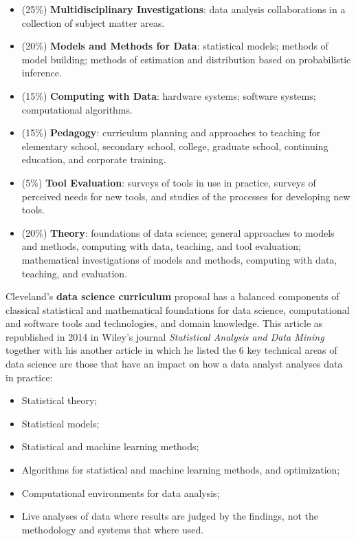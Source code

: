 \documentclass[
]{book}
\providecommand{\tightlist}{%
  \setlength{\itemsep}{0pt}\setlength{\parskip}{0pt}}
\begin{document}
\begin{itemize}
\item
  (25\%) \textbf{Multidisciplinary Investigations}: data analysis collaborations in a collection of subject matter areas.
\item
  (20\%) \textbf{Models and Methods for Data}: statistical models; methods of model building; methods of estimation and distribution based on probabilistic inference.
\item
  (15\%) \textbf{Computing with Data}: hardware systems; software systems; computational algorithms.
\item
  (15\%) \textbf{Pedagogy}: curriculum planning and approaches to teaching for elementary school, secondary school, college, graduate school, continuing education, and corporate training.
\item
  (5\%) \textbf{Tool Evaluation}: surveys of tools in use in practice, surveys of perceived needs for new tools, and studies of the processes for developing new tools.
\item
  (20\%) \textbf{Theory}: foundations of data science; general approaches to models and methods, computing with data, teaching, and tool evaluation; mathematical investigations of models and methods, computing with data, teaching, and evaluation.
\end{itemize}

Cleveland's \textbf{data science curriculum} proposal has a balanced components of classical statistical and mathematical foundations for data science, computational and software tools and technologies, and domain knowledge. This article as republished in 2014 in Wiley's journal \emph{Statistical Analysis and Data Mining} together with his another article in which he listed the 6 key technical areas of data science are those that have an impact on how a data analyst analyses data in practice:

\begin{itemize}
\tightlist
\item
  Statistical theory;
\item
  Statistical models;
\item
  Statistical and machine learning methods;
\item
  Algorithms for statistical and machine learning methods, and optimization;
\item
  Computational environments for data analysis;
\item
  Live analyses of data where results are judged by the findings, not the methodology and systems that where used.
\end{itemize}
\end{document}
